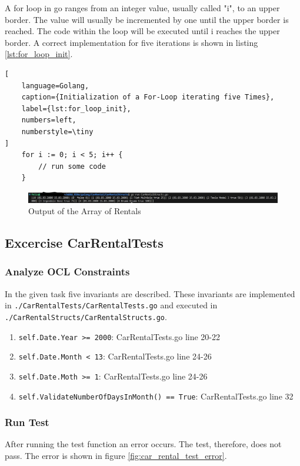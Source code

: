A for loop in go ranges from an integer value, usually called "i", to an upper border.
The value will usually be incremented by one until the upper border is reached. 
The code within the loop will be executed until i reaches the upper border.
A correct implementation for five iterations is shown in listing \ref{lst:for_loop_init}.

\begin{lstlisting}[
    language=Golang,
    caption={Initialization of a For-Loop iterating five Times},
    label={lst:for_loop_init},
    numbers=left,
    numberstyle=\tiny
]
    for i := 0; i < 5; i++ {
        // run some code
    }
\end{lstlisting}

\begin{figure}[H]
    \centering
    \includegraphics[width=\textwidth]{figures/goLang/carRental/carRental_arrayFiveRentals.png}
    \caption{Output of the Array of Rentals}
    \label{fig:car_rental_array_five_rentals}
\end{figure}

\subsection{Excercise CarRentalTests}
\label{sec:car_rental_tests}
\subsubsection*{Analyze OCL Constraints}
In the given task five invariants are described.
These invariants are implemented in \texttt{./CarRentalTests/CarRentalTests.go} and executed in \texttt{./CarRentalStructs/CarRentalStructs.go}.
\begin{enumerate}
    \item \texttt{self.Date.Year >= 2000}: CarRentalTests.go line 20-22
    \item \texttt{self.Date.Month < 13}: CarRentalTests.go line 24-26
    \item \texttt{self.Date.Moth >= 1}: CarRentalTests.go line 24-26
    \item \texttt{self.ValidateNumberOfDaysInMonth() == True}: CarRentalTests.go line 32
\end{enumerate}

\subsubsection*{Run Test}
After running the test function an error occurs. 
The test, therefore, does not pass.
The error is shown in figure \ref{fig:car_rental_test_error}.

